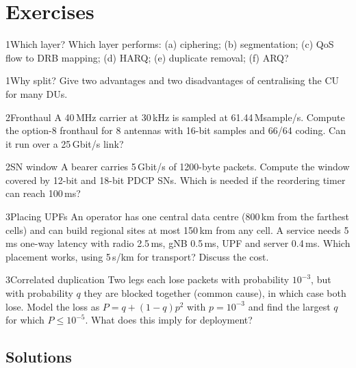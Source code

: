 \documentclass[11pt,a4paper]{article}
\begin{document}
\section{Exercises}

\begin{exercisebox}{1}{Which layer?}\label{exr:layer}
Which layer performs: (a) ciphering; (b) segmentation; (c) QoS flow to DRB mapping; (d) HARQ; (e) duplicate removal; (f) ARQ?
\end{exercisebox}

\begin{exercisebox}{1}{Why split?}\label{exr:why}
Give two advantages and two disadvantages of centralising the CU for many DUs.
\end{exercisebox}

\begin{exercisebox}{2}{Fronthaul}\label{exr:fh}
A 40\,MHz carrier at 30\,kHz is sampled at 61.44\,Msample/s. Compute the option-8 fronthaul for 8 antennas with 16-bit samples and 66/64 coding. Can it run over
a 25\,Gbit/s link?
\end{exercisebox}

\begin{exercisebox}{2}{SN window}\label{exr:sn}
A bearer carries 5\,Gbit/s of 1200-byte packets. Compute the window covered by 12-bit and 18-bit PDCP SNs. Which is needed if the reordering timer can reach 100\,ms?
\end{exercisebox}

\begin{exercisebox}{3}{Placing UPFs}\label{exr:place}
An operator has one central data centre (800\,km from the farthest cells) and can build regional sites at most 150\,km from any cell. A service needs 5\,ms one-way
latency with radio 2.5\,ms, gNB 0.5\,ms, UPF and server 0.4\,ms. Which placement works, using 5\,\textmu s/km for transport? Discuss the cost.
\end{exercisebox}

\begin{exercisebox}{3}{Correlated duplication}\label{exr:corr}
Two legs each lose packets with probability $10^{-3}$, but with probability $q$ they are blocked together (common cause), in which case both lose. Model the loss as
$P = q + (1-q)p^2$ with $p = 10^{-3}$ and find the largest $q$ for which $P \le 10^{-5}$. What does this imply for deployment?
\end{exercisebox}

\subsection*{Solutions}
\end{document}
